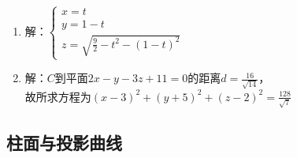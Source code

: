 \documentclass[UTF8]{ctexart}
\begin{document}
\begin{enumerate}
\item 解：$\left\{\begin{array}{l}x=t\\y=1-t\\z=\sqrt{\displaystyle\frac{9}{2}-t^2-\left(1-t\right)^2}\end{array}\right.$

\item 解：$C$到平面$2x-y-3z+11=0$的距离$d=\displaystyle\frac{16}{\sqrt{14}}$，\\故所求方程为$\left(x-3\right)^2+\left(y+5\right)^2+\left(z-2\right)^2=\displaystyle\frac{128}{\sqrt{7}}$
\end{enumerate}

\subsection{柱面与投影曲线}
\end{document}
